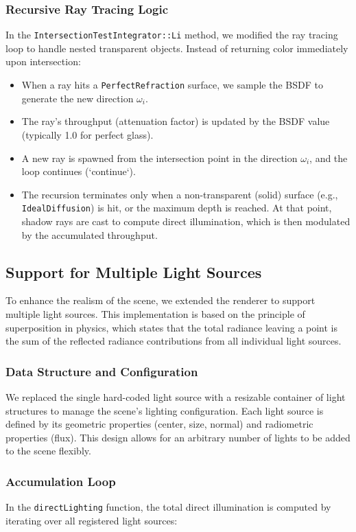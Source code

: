 \documentclass[acmtog]{acmart}
\begin{document}
\subsubsection{Recursive Ray Tracing Logic}
In the \texttt{IntersectionTestIntegrator::Li} method, we modified the ray tracing loop to handle nested transparent objects. Instead of returning color immediately upon intersection:
\begin{itemize}
    \item When a ray hits a \texttt{PerfectRefraction} surface, we sample the BSDF to generate the new direction $\omega_i$.
    \item The ray's throughput (attenuation factor) is updated by the BSDF value (typically 1.0 for perfect glass).
    \item A new ray is spawned from the intersection point in the direction $\omega_i$, and the loop continues (`continue`).
    \item The recursion terminates only when a non-transparent (solid) surface (e.g., \texttt{IdealDiffusion}) is hit, or the maximum depth is reached. At that point, shadow rays are cast to compute direct illumination, which is then modulated by the accumulated throughput.
\end{itemize}
\subsection{Support for Multiple Light Sources}

To enhance the realism of the scene, we extended the renderer to support multiple light sources. This implementation is based on the principle of superposition in physics, which states that the total radiance leaving a point is the sum of the reflected radiance contributions from all individual light sources.

\subsubsection{Data Structure and Configuration}
We replaced the single hard-coded light source with a resizable container of light structures to manage the scene's lighting configuration. Each light source is defined by its geometric properties (center, size, normal) and radiometric properties (flux). This design allows for an arbitrary number of lights to be added to the scene flexibly.

\subsubsection{Accumulation Loop}
In the \texttt{directLighting} function, the total direct illumination is computed by iterating over all registered light sources:
\end{document}
